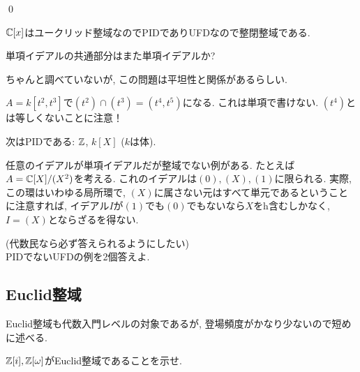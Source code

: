 \qed




\begin{eg}
$\mathbb{C}[x]$はユークリッド整域なのでPIDでありUFDなので整閉整域である.
\end{eg}

\begin{egprob}
単項イデアルの共通部分はまた単項イデアルか?
\end{egprob}
\begin{egans}
ちゃんと調べていないが, この問題は平坦性と関係があるらしい. \par
$A=k[t^2,t^3]$で$(t^2)\cap (t^3) = (t^4,t^5)$になる. これは単項で書けない. $(t^4)$とは等しくないことに注意！
\end{egans}







\begin{eg}
次はPIDである: $\mathbb{Z}$, $k[X]$ ($k$は体).
\end{eg}

\begin{rem}
任意のイデアルが単項イデアルだが整域でない例がある. たとえば$A=\mathbb{C}[X]/(X^2)$を考える. これのイデアルは$(0),(X),(1)$に限られる. 実際, この環はいわゆる局所環で, $(X)$に属さない元はすべて単元であるということに注意すれば, イデアル$I$が$(1)$でも$(0)$でもないなら$X$をh含むしかなく, $I=(X)$とならざるを得ない.
\end{rem}

\begin{prac} (代数民なら必ず答えられるようにしたい)\\
PIDでないUFDの例を2個答えよ.
\end{prac}


\subsection{Euclid整域}
Euclid整域も代数入門レベルの対象であるが, 登場頻度がかなり少ないので短めに述べる.
\begin{prop}

\end{prop}


\begin{egprob}
$\mathbb{Z}[i], \mathbb{Z}[\omega]$がEuclid整域であることを示せ.
\end{egprob}






